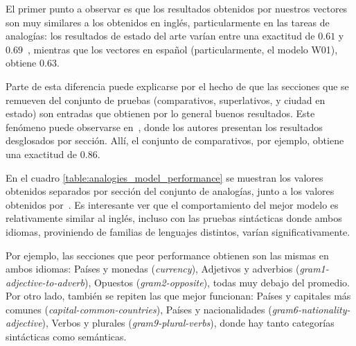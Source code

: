 El primer punto a observar es que los resultados obtenidos por nuestros vectores son muy similares a
los obtenidos en inglés, particularmente en las tareas de analogías: los resultados de estado del
arte varían entre una exactitud de $0.61$ y $0.69$~\cite{Levy2015, Baroni2014, Pennington2014,
Mikolov2013c}, mientras que los vectores en español (particularmente, el modelo W01), obtiene
$0.63$.

Parte de esta diferencia puede explicarse por el hecho de que las secciones que se remueven del
conjunto de pruebas (comparativos, superlativos, y ciudad en estado) son entradas que obtienen por
lo general buenos resultados. Este fenómeno puede observarse en~\cite{Levy2014b}, donde los autores
presentan los resultados desglosados por sección. Allí, el conjunto de comparativos, por ejemplo,
obtiene una exactitud de $0.86$.

En el cuadro \ref{table:analogies_model_performance} se muestran los valores obtenidos separados
por sección del conjunto de analogías, junto a los valores obtenidos por~\cite{Levy2014b}. Es
interesante ver que el comportamiento del mejor modelo es relativamente similar al inglés, incluso
con las pruebas sintácticas donde ambos idiomas, proviniendo de familias de lenguajes distintos,
varían significativamente.

Por ejemplo, las secciones que peor performance obtienen son las mismas en ambos idiomas: Países y
monedas (\textit{currency}), Adjetivos y adverbios (\textit{gram1-adjective-to-adverb}), Opuestos
(\textit{gram2-opposite}), todas muy debajo del promedio. Por otro lado, también se repiten las que
mejor funcionan: Países y capitales más comunes (\textit{capital-common-countries}), Países y
nacionalidades (\textit{gram6-nationality-adjective}), Verbos y plurales (\textit{gram9-plural-verbs}),
donde hay tanto categorías sintácticas como semánticas.

